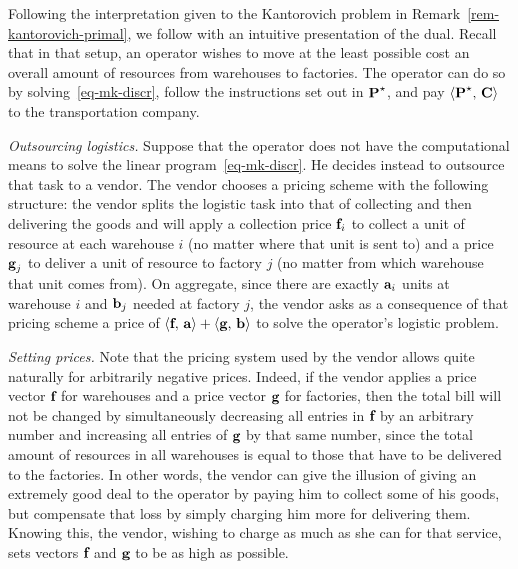 \begin{rem}\label{rem-kantorovich-dual}
Following the interpretation given to the Kantorovich problem in Remark~\ref{rem-kantorovich-primal}, we follow with an intuitive presentation of the dual. Recall that in that setup, an operator wishes to move at the least possible cost an overall amount of resources from warehouses to factories. The operator can do so by solving~\eqref{eq-mk-discr}, follow the instructions set out in $\P^\star$, and pay $\dotp{\P^\star}{\C}$ to the transportation company.

\emph{Outsourcing logistics.} Suppose that the operator does not have the computational means to solve the linear program~\eqref{eq-mk-discr}. He decides instead to outsource that task to a vendor. The vendor chooses a pricing scheme with the following structure: the vendor splits the logistic task into that of collecting and then delivering the goods and will apply a collection price $\fD_i$ to collect a unit of resource at each warehouse $i$ (no matter where that unit is sent to) and a price $\gD_j$ to deliver a unit of resource to factory $j$ (no matter from which warehouse that unit comes from). On aggregate, since there are exactly $\a_i$ units at warehouse $i$ and $\b_j$ needed at factory $j$, the vendor asks as a consequence of that pricing scheme a price of $\dotp{\fD}{\a}+\dotp{\gD}{\b}$ to solve the operator's logistic problem.

\emph{Setting prices.} Note that the pricing system used by the vendor allows quite naturally for arbitrarily negative prices. Indeed, if the vendor applies a price vector $\fD$ for warehouses and a price vector $\gD$ for factories, then the total bill will not be changed by simultaneously decreasing all entries in $\fD$ by an arbitrary number and increasing all entries of $\gD$ by that same number, since the total amount of resources in all warehouses is equal to those that have to be delivered to the factories. In other words, the vendor can give the illusion of giving an extremely good deal to the operator by paying him to collect some of his goods, but compensate that loss by simply charging him more for delivering them. Knowing this, the vendor, wishing to charge as much as she can for that service, sets vectors $\fD$ and $\gD$ to be as high as possible.


\end{rem}
